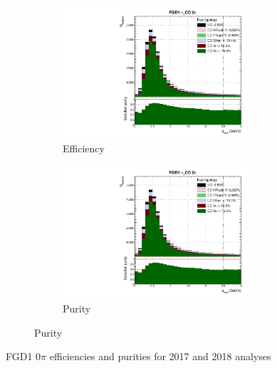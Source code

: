 \begin{figure}[h]
	\begin{subfigure}[t]{\textwidth}
		\centering
		\caption*{2017 analysis}
		\begin{subfigure}[t]{0.4\textwidth}
			\includegraphics[width=\textwidth,page=1, trim={0mm 0mm 0mm 9mm}, clip]{figures/mach3/selection/2017b_Diag_WithSelection}
			\caption{Efficiency}
		\end{subfigure}
		\begin{subfigure}[t]{0.4\textwidth}
			\includegraphics[width=\textwidth,page=2, trim={0mm 0mm 0mm 9mm}, clip]{figures/mach3/selection/2017b_Diag_WithSelection}
			\caption{Purity}
		\end{subfigure}
	\end{subfigure}
	\caption{FGD1 0$\pi$ efficiencies and purities for 2017 and 2018 analyses}
	\label{fig:fgd1_cc0pi_eff_2017_2018}
\end{figure}


